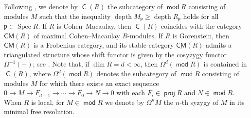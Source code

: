 \documentclass[10pt]{amsart}
\theoremstyle{definition}
\theoremstyle{remark}
\numberwithin{equation}{thm}
\def\c{\operatorname{\mathsf{C}}}
\def\CM{\mathsf{CM}}
\def\depth{\operatorname{depth}}
\def\dim{\operatorname{dim}}
\def\ge{\geqslant}
\def\mod{\operatorname{\mathsf{mod}}}
\def\p{\mathfrak{p}}
\def\proj{\operatorname{\mathsf{proj}}}
\def\Spec{\operatorname{Spec}}
\begin{document}
Following \cite{T2023}, we denote by $\c(R)$ the subcategory of $\mod R$ consisting of modules $M$ such that the inequality $\depth M_{\p} \ge \depth R_{\p}$ holds for all $\p \in \Spec R$.
If $R$ is Cohen--Macaulay, then $\c(R)$ coincides with the category $\CM(R)$ of maximal Cohen--Macaulay $R$-modules.
If $R$ is Gorenstein, then $\CM(R)$ is a Frobenius category, and its stable category $\underline{\CM}(R)$ admits a triangulated structure whose shift functor is given by the cosyzygy functor $\Omega^{-1}(-)$; see \cite[Chapter I]{Hap}.
Note that, if $\dim R=d<\infty$, then $\Omega^{d}(\mod R)$ is contained in $\c(R)$, where $\Omega^{d}(\mod R)$ denotes the subcategory of $\mod R$ consisting of modules $M$ for which there exists an exact sequence $0 \to M \to F_{d-1} \to \cdots \to F_0 \to N \to 0$ with each $F_i \in \proj R$ and $N \in \mod R$.
When $R$ is local, for $M \in \mod R$ we denote by $\Omega^n M$ the $n$-th syzygy of $M$ in its minimal free resolution.
\end{document}
